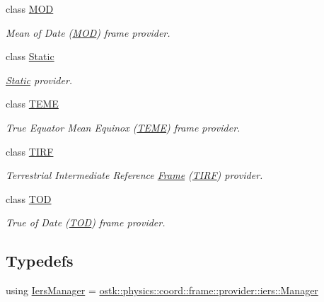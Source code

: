 \begin{DoxyCompactItemize}
class \hyperlink{classostk_1_1physics_1_1coord_1_1frame_1_1provider_1_1_m_o_d}{M\+OD}
\begin{DoxyCompactList}\small\item\em Mean of Date (\hyperlink{classostk_1_1physics_1_1coord_1_1frame_1_1provider_1_1_m_o_d}{M\+OD}) frame provider. \end{DoxyCompactList}\item 
class \hyperlink{classostk_1_1physics_1_1coord_1_1frame_1_1provider_1_1_static}{Static}
\begin{DoxyCompactList}\small\item\em \hyperlink{classostk_1_1physics_1_1coord_1_1frame_1_1provider_1_1_static}{Static} provider. \end{DoxyCompactList}\item 
class \hyperlink{classostk_1_1physics_1_1coord_1_1frame_1_1provider_1_1_t_e_m_e}{T\+E\+ME}
\begin{DoxyCompactList}\small\item\em True Equator Mean Equinox (\hyperlink{classostk_1_1physics_1_1coord_1_1frame_1_1provider_1_1_t_e_m_e}{T\+E\+ME}) frame provider. \end{DoxyCompactList}\item 
class \hyperlink{classostk_1_1physics_1_1coord_1_1frame_1_1provider_1_1_t_i_r_f}{T\+I\+RF}
\begin{DoxyCompactList}\small\item\em Terrestrial Intermediate Reference \hyperlink{classostk_1_1physics_1_1coord_1_1_frame}{Frame} (\hyperlink{classostk_1_1physics_1_1coord_1_1frame_1_1provider_1_1_t_i_r_f}{T\+I\+RF}) provider. \end{DoxyCompactList}\item 
class \hyperlink{classostk_1_1physics_1_1coord_1_1frame_1_1provider_1_1_t_o_d}{T\+OD}
\begin{DoxyCompactList}\small\item\em True of Date (\hyperlink{classostk_1_1physics_1_1coord_1_1frame_1_1provider_1_1_t_o_d}{T\+OD}) frame provider. \end{DoxyCompactList}\end{DoxyCompactItemize}
\subsection*{Typedefs}
\begin{DoxyCompactItemize}
\item 
using \hyperlink{namespaceostk_1_1physics_1_1coord_1_1frame_1_1provider_a4a4183a2547e2e41d722a832c7e1c137}{Iers\+Manager} = \hyperlink{classostk_1_1physics_1_1coord_1_1frame_1_1provider_1_1iers_1_1_manager}{ostk\+::physics\+::coord\+::frame\+::provider\+::iers\+::\+Manager}
\end{DoxyCompactItemize}
